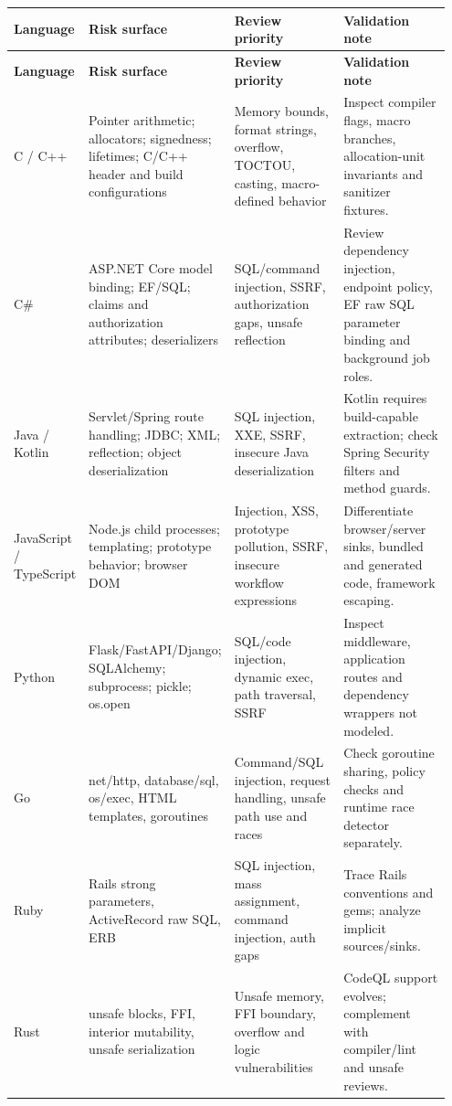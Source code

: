 \documentclass[11pt,letterpaper,oneside]{book}
\begin{document}
\small
\setlength{\tabcolsep}{2pt}
\renewcommand{\arraystretch}{1.18}
\begin{longtable}{>{\raggedright\arraybackslash}p{0.13\linewidth}>{\raggedright\arraybackslash}p{0.27\linewidth}>{\raggedright\arraybackslash}p{0.27\linewidth}>{\raggedright\arraybackslash}p{0.28\linewidth}}
\toprule
\textbf{Language} & \textbf{Risk surface} & \textbf{Review priority} & \textbf{Validation note}\\
\midrule
\endfirsthead
\toprule
\textbf{Language} & \textbf{Risk surface} & \textbf{Review priority} & \textbf{Validation note}\\
\midrule
\endhead
C / C++ & Pointer arithmetic; allocators; signedness; lifetimes; C/C++ header and build configurations & Memory bounds, format strings, overflow, TOCTOU, casting, macro-defined behavior & Inspect compiler flags, macro branches, allocation-unit invariants and sanitizer fixtures.\\
C\# & ASP.NET Core model binding; EF/SQL; claims and authorization attributes; deserializers & SQL/command injection, SSRF, authorization gaps, unsafe reflection & Review dependency injection, endpoint policy, EF raw SQL parameter binding and background job roles.\\
Java / Kotlin & Servlet/Spring route handling; JDBC; XML; reflection; object deserialization & SQL injection, XXE, SSRF, insecure Java deserialization & Kotlin requires build-capable extraction; check Spring Security filters and method guards.\\
JavaScript / TypeScript & Node.js child processes; templating; prototype behavior; browser DOM & Injection, XSS, prototype pollution, SSRF, insecure workflow expressions & Differentiate browser/server sinks, bundled and generated code, framework escaping.\\
Python & Flask/FastAPI/Django; SQLAlchemy; subprocess; pickle; os.open & SQL/code injection, dynamic exec, path traversal, SSRF & Inspect middleware, application routes and dependency wrappers not modeled.\\
Go & net/http, database/sql, os/exec, HTML templates, goroutines & Command/SQL injection, request handling, unsafe path use and races & Check goroutine sharing, policy checks and runtime race detector separately.\\
Ruby & Rails strong parameters, ActiveRecord raw SQL, ERB & SQL injection, mass assignment, command injection, auth gaps & Trace Rails conventions and gems; analyze implicit sources/sinks.\\
Rust & unsafe blocks, FFI, interior mutability, unsafe serialization & Unsafe memory, FFI boundary, overflow and logic vulnerabilities & CodeQL support evolves; complement with compiler/lint and unsafe reviews.\\

\end{longtable}
\end{document}
